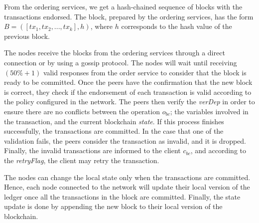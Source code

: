 \documentclass[conference]{llncs}
\newcommand{\name}{BlindCons}
\begin{document}
\begin{figure*}[tb]
{}
\caption{\name{} ordering service}
\label{dia:ord}
\end{figure*}

From the ordering services, we get a hash-chained sequence of blocks with the transactions endorsed. The block, prepared by the ordering services, has the form $B=\left(\left[tx_1,tx_2,...,tx_k\right],h\right)$, where $h$ corresponds to the hash value of the previous block.

The nodes receive the blocks from the ordering services through a direct connection or by using a gossip protocol. The nodes will wait until receiving $(50\%+1)$ valid responses from the order service to consider that the block is ready to be committed. Once the peers have the confirmation that the new block is correct, they check if the endorsement of each transaction is valid according to the policy configured in the network. The peers then verify the \textit{verDep} in order to ensure there are no conflicts between the operation $o_{bc}$; the variables involved in the transaction, and the current blockchain \textit{state}. If this process finishes successfully, the transactions are committed. In the case that one of the validation fails, the peers consider the transaction as invalid, and it is dropped. Finally, the invalid transactions are informed to the client $c_{bc}$, and according to the \textit{retryFlag}, the client may retry the transaction.

The nodes can change the local state only when the transactions are committed. Hence, each node connected to the network will update their local version of the ledger once all the transactions in the block are committed. Finally, the state update is done by appending the new block to their local version of the blockchain.
\end{document}
